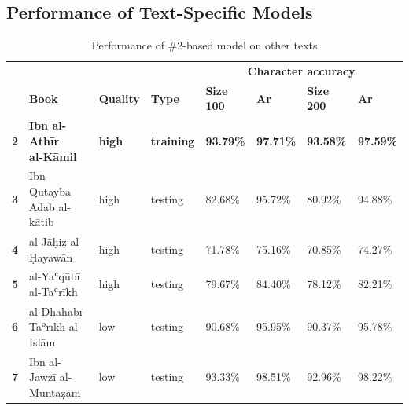 \begin{subappendices}
\newpage
\section{Performance of Text-Specific Models}

\begin{table}[H]
\begin{minipage}{\textwidth}
\begin{center}
\caption{Performance of \#2-based model on other texts}
\label{tab:soa_atab1}
\renewcommand*{\thefootnote}{\alph{footnote}}
\begin{tabularx}{\textwidth}{lp{2.2cm}XXXXXX} \toprule
& & & & \multicolumn{4}{c}{\textbf{Character accuracy}}\\
\cline{5-8}
& \textbf{Book}& \textbf{Quality} & \textbf{Type} & \textbf{Size 100} & \textbf{Ar}& \textbf{Size 200} & \textbf{Ar}\\\midrule
\textbf{2} & \textbf{Ibn al-Athīr \newline\scriptsize{al-Kāmil}} &  	  \textbf{high} & \textbf{training} & \textbf{93.79\%} & \textbf{97.71\%} & \textbf{93.58\%} & \textbf{97.59\%}\\
\textbf{3} & Ibn Qutayba \newline\scriptsize{Adab al-kātib} & high& testing	& 82.68\% & 95.72\% & 80.92\% & 94.88\% \\
\textbf{4} & al-Jāḥiẓ \newline\scriptsize{al-Ḥayawān} & 	  high& testing & 71.78\% & 75.16\% & 70.85\% & 74.27\%\\
\textbf{5} & al-Yaʿqūbī \newline\scriptsize{al-Taʿrīkh} & 	  high& testing & 79.67\% & 84.40\% & 78.12\% & 82.21\%\\
\textbf{6} & al-Dhahabī \newline\scriptsize{Taʾrīkh al-Islām}  & low& testing	& 90.68\% & 95.95\% & 90.37\% & 95.78\%\\
\textbf{7} & Ibn al-Jawzī \newline\scriptsize{al-Muntaẓam} &    low& testing & 93.33\% & 98.51\% & 92.96\% & 98.22\%\\
\bottomrule
\end{tabularx}
\end{center}
\end{minipage}
\end{table}


\end{subappendices}
